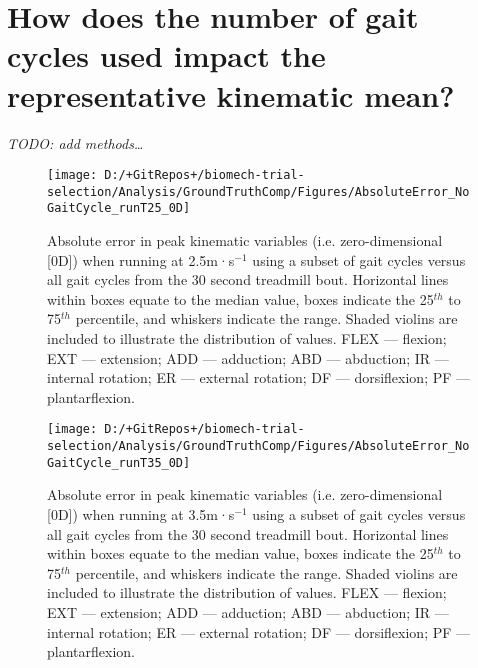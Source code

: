 \documentclass[]{elsarticle} %
\begin{document}
\hypertarget{how-does-the-number-of-gait-cycles-used-impact-the-representative-kinematic-mean}{%
\section{How does the number of gait cycles used impact the
representative kinematic
mean?}\label{how-does-the-number-of-gait-cycles-used-impact-the-representative-kinematic-mean}}

\emph{TODO: add methods\ldots{}}

\begin{figure}

{\centering \texttt{[image: D:/+GitRepos+/biomech-trial-selection/Analysis/GroundTruthComp/Figures/AbsoluteError\_NoGaitCycle\_runT25\_0D]} 

}

\caption{Absolute error in peak kinematic variables (i.e. zero-dimensional [0D]) when running at 2.5m·s$^{-1}$ using a subset of gait cycles versus all gait cycles from the 30 second treadmill bout. Horizontal lines within boxes equate to the median value, boxes indicate the 25$^{th}$ to 75$^{th}$ percentile, and whiskers indicate the range. Shaded violins are included to illustrate the distribution of values. FLEX — flexion; EXT — extension; ADD — adduction; ABD — abduction; IR — internal rotation; ER — external rotation; DF — dorsiflexion; PF — plantarflexion.}\label{fig:groundTruthError_runT25_0D}
\end{figure}

\begin{figure}

{\centering \texttt{[image: D:/+GitRepos+/biomech-trial-selection/Analysis/GroundTruthComp/Figures/AbsoluteError\_NoGaitCycle\_runT35\_0D]} 

}

\caption{Absolute error in peak kinematic variables (i.e. zero-dimensional [0D]) when running at 3.5m·s$^{-1}$ using a subset of gait cycles versus all gait cycles from the 30 second treadmill bout. Horizontal lines within boxes equate to the median value, boxes indicate the 25$^{th}$ to 75$^{th}$ percentile, and whiskers indicate the range. Shaded violins are included to illustrate the distribution of values. FLEX — flexion; EXT — extension; ADD — adduction; ABD — abduction; IR — internal rotation; ER — external rotation; DF — dorsiflexion; PF — plantarflexion.}\label{fig:groundTruthError_runT35_0D}
\end{figure}
\end{document}
